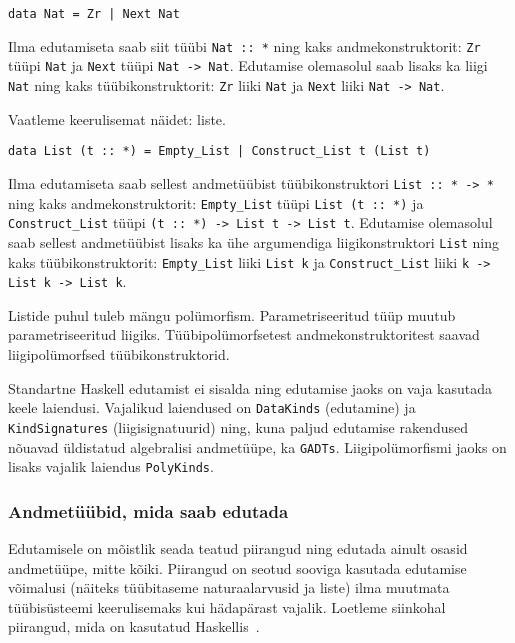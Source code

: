 \documentclass[12pt]{article}
\begin{document}
        \begin{verbatim}data Nat = Zr | Next Nat\end{verbatim}

        Ilma edutamiseta saab siit tüübi \verb!Nat :: *! ning kaks andmekonstruktorit: \verb!Zr! tüüpi \verb!Nat! ja \verb!Next! tüüpi \verb!Nat -> Nat!. Edutamise olemasolul saab lisaks ka liigi \verb!Nat! ning kaks tüübikonstruktorit: \verb!Zr! liiki \verb!Nat! ja \verb!Next! liiki \verb!Nat -> Nat!.

        Vaatleme keerulisemat näidet: liste.

        \begin{verbatim}data List (t :: *) = Empty_List | Construct_List t (List t)\end{verbatim}

        Ilma edutamiseta saab sellest andmetüübist tüübikonstruktori \verb!List :: * -> *! ning kaks andmekonstruktorit: \verb!Empty_List! tüüpi \verb!List (t :: *)! ja \verb!Construct_List! tüüpi \verb!(t :: *) -> List t -> List t!. Edutamise olemasolul saab sellest andmetüübist lisaks ka ühe argumendiga liigikonstruktori \verb!List! ning kaks tüübikonstruktorit: \verb!Empty_List! liiki \verb!List k! ja \verb!Construct_List! liiki \verb!k -> List k -> List k!.

        Listide puhul tuleb mängu polümorfism. Parametriseeritud tüüp muutub parametriseeritud liigiks. Tüübipolümorfsetest andmekonstruktoritest saavad liigipolümorfsed tüübikonstruktorid.

        Standartne Haskell edutamist ei sisalda ning edutamise jaoks on vaja kasutada keele laiendusi. Vajalikud laiendused on \verb!DataKinds! (edutamine) ja \verb!KindSignatures! (liigisignatuurid) ning, kuna paljud edutamise rakendused nõuavad üldistatud algebralisi andmetüüpe, ka \verb!GADTs!. Liigipolümorfismi jaoks on lisaks vajalik laiendus \verb!PolyKinds!.
      \subsubsection{Andmetüübid, mida saab edutada}\label{kitsendused}
        Edutamisele on mõistlik seada teatud piirangud ning edutada ainult osasid andmetüüpe, mitte kõiki. Piirangud on seotud sooviga kasutada edutamise võimalusi (näiteks tüübitaseme naturaalarvusid ja liste) ilma muutmata tüübisüsteemi keerulisemaks kui hädapärast vajalik. Loetleme siinkohal piirangud, mida on kasutatud Haskellis~\cite{Giv}.
\end{document}
